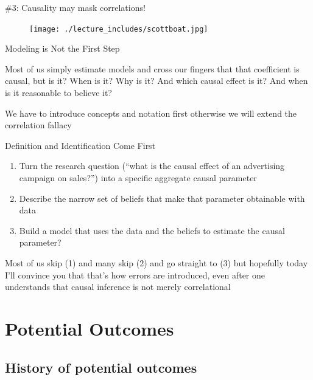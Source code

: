 \documentclass{beamer}
\begin{document}
\begin{frame}{\#3: Causality may mask correlations!}

  \begin{figure}
    \centering
    \texttt{[image: ./lecture\_includes/scottboat.jpg]}
  \end{figure}

\end{frame}






\begin{frame}{Modeling is Not the First Step}

Most of us simply estimate models and cross our fingers that that coefficient is causal, but is it? When is it?  Why is it? And which causal effect is it?  And when is it reasonable to believe it? 

\bigskip

We have to introduce concepts and notation first otherwise we will extend the correlation fallacy


\end{frame}



\begin{frame}{Definition and Identification Come First}

\begin{enumerate}
\item Turn the research question (``what is the causal effect of an advertising campaign on sales?'') into a specific aggregate causal parameter
\item Describe the narrow set of beliefs that make that parameter obtainable with data
\item Build a model that uses the data and the beliefs to estimate the causal parameter?
\end{enumerate}

\bigskip

Most of us skip (1) and many skip (2) and go straight to (3) but hopefully today I'll convince you that that's how errors are introduced, even after one understands that causal inference is not merely correlational

\end{frame}

\section{Potential Outcomes}

\subsection{History of potential outcomes}
\end{document}
